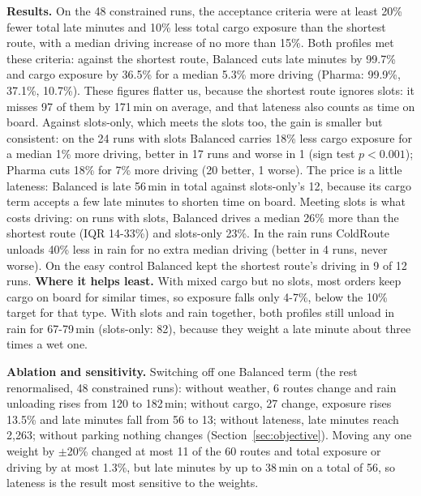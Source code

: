 \documentclass[10.5pt,a4paper]{article}
\begin{document}
\textbf{Results.} On the 48 constrained runs, the acceptance criteria were at least 20\% fewer total late minutes and 10\% less total cargo exposure than the shortest route, with a median driving increase of no more than 15\%. Both profiles met these criteria: against the shortest route,
Balanced cuts late minutes by 99.7\% and cargo exposure by 36.5\% for a median 5.3\% more driving (Pharma: 99.9\%, 37.1\%,
10.7\%). These figures flatter us, because the shortest route ignores slots: it misses 97 of them by 171\,min on average,
and that lateness also counts as time on board. Against slots-only, which meets the slots too, the gain is smaller but
consistent: on the 24 runs with slots Balanced carries 18\% less cargo exposure for a median 1\% more driving, better in 17
runs and worse in 1 (sign test $p<0.001$); Pharma cuts 18\% for 7\% more driving (20 better, 1 worse). The price is a little
lateness: Balanced is late 56\,min in total against slots-only's 12, because its cargo term accepts a few late minutes to
shorten time on board. Meeting slots is what costs driving: on runs with slots, Balanced drives a median 26\% more than the
shortest route (IQR 14-33\%) and slots-only 23\%. In the rain runs ColdRoute unloads 40\% less in rain for no extra median
driving (better in 4 runs, never worse). On the easy control Balanced kept the shortest route's driving in 9 of 12 runs.
\textbf{Where it helps least.} With mixed cargo but no slots, most orders keep cargo on board for similar times, so exposure
falls only 4-7\%, below the 10\% target for that type. With slots and rain together, both profiles still unload in rain for
67-79\,min (slots-only: 82), because they weight a late minute about three times a wet one.

\textbf{Ablation and sensitivity.} Switching off one Balanced term (the rest renormalised, 48 constrained runs): without
weather, 6 routes change and rain unloading rises from 120 to 182\,min; without cargo, 27 change, exposure rises 13.5\% and late
minutes fall from 56 to 13; without lateness, late minutes reach 2,263; without parking nothing changes
(Section~\ref{sec:objective}). Moving any one weight by $\pm$20\% changed at most 11 of the 60 routes and total exposure or
driving by at most 1.3\%, but late minutes by up to 38\,min on a total of 56, so lateness is the result most sensitive to the weights.
\end{document}
